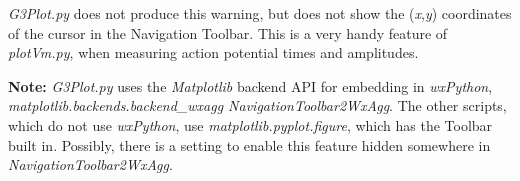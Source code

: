 \documentclass[12pt]{article}
\begin{document}
{\it G3Plot.py} does not produce this warning, but does not show the ({\it x},{\it y})
coordinates of the cursor in the Navigation Toolbar.  This is a very handy
feature of {\it plotVm.py}, when measuring action potential times and amplitudes.

{\bf Note:} {\it G3Plot.py} uses the {\it Matplotlib} backend API for embedding in {\it wxPython},
{\it matplotlib.backends.backend\_wxagg NavigationToolbar2WxAgg}.  The other
scripts, which do not use {\it wxPython}, use {\it matplotlib.pyplot.figure}, which has
the Toolbar built in.  Possibly, there is a setting to enable this feature
hidden somewhere in {\it NavigationToolbar2WxAgg}.



\end{document}
